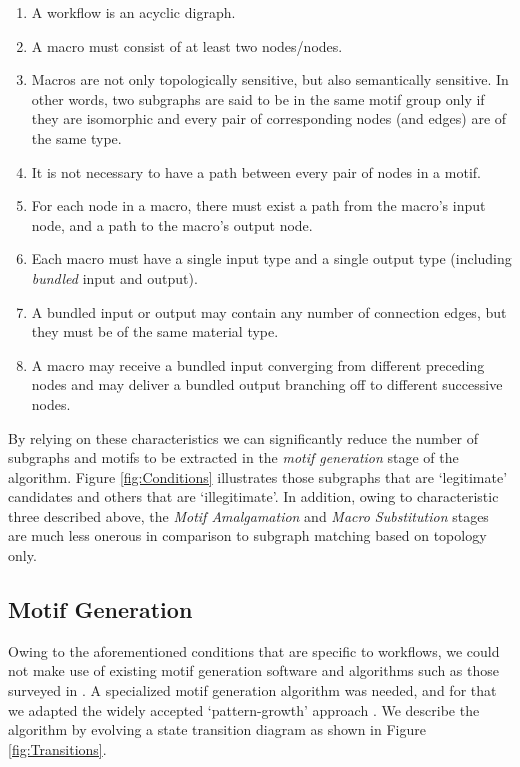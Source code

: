 \vspace{-2mm}
\begin{enumerate}[itemsep=-1mm]
\item A workflow is an acyclic digraph.
\item A macro must consist of at least two nodes/nodes.
\item Macros are not only topologically sensitive, but also semantically sensitive. In other words, two subgraphs are said to be in the same motif group only if they are isomorphic and every pair of corresponding nodes (and edges) are of the same type.
\item It is not necessary to have a path between every pair of nodes in a motif.
\item For each node in a macro, there must exist a path from the macro's input node, and a path to the macro's output node.
\item Each macro must have a single input type and a single output type (including \emph{bundled} input and output).
\item A bundled input or output may contain any number of connection edges, but they must be of the same material type.
\item A macro may receive a bundled input converging from different preceding nodes and may deliver a bundled output branching off to different successive nodes.
\end{enumerate}

\vspace{-1mm}
By relying on these characteristics we can significantly reduce the number of subgraphs and motifs to be extracted in the \emph{motif generation} stage of the algorithm.
Figure \ref{fig:Conditions} illustrates those subgraphs that are `legitimate' candidates and others that are `illegitimate'.
In addition, owing to characteristic three described above, the \emph{Motif Amalgamation} and \emph{Macro Substitution} stages are much less onerous in comparison to subgraph matching based on topology only. 

\subsection{Motif Generation}
\label{sec:Algorithm}
%
Owing to the aforementioned conditions that are specific to workflows, we could not make use of existing motif generation software and algorithms such as those surveyed in \cite{Wong:2012}.
A specialized motif generation algorithm was needed, and for that we adapted the widely accepted `pattern-growth' approach \cite{Wong:2012}.
We describe the algorithm by evolving a state transition diagram as shown in Figure \ref{fig:Transitions}.

